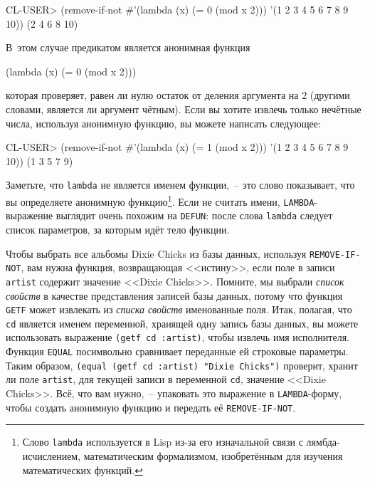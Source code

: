 \begin{myverb}
CL-USER> (remove-if-not #'(lambda (x) (= 0 (mod x 2))) '(1 2 3 4 5 6 7 8 9 10))
(2 4 6 8 10)
\end{myverb}

В~этом случае предикатом является анонимная функция

\begin{myverb}
(lambda (x) (= 0 (mod x 2)))
\end{myverb}

\noindent{}которая проверяет, равен ли нулю остаток от деления аргумента на 2 (другими словами,
является ли аргумент чётным). Если вы хотите извлечь только нечётные числа, используя
анонимную функцию, вы можете написать следующее:

\begin{myverb}
CL-USER> (remove-if-not #'(lambda (x) (= 1 (mod x 2))) '(1 2 3 4 5 6 7 8 9 10))
(1 3 5 7 9)
\end{myverb}

Заметьте, что \lstinline{lambda} не является именем функции,~-- это слово показывает, что вы
определяете анонимную функцию\footnote{Слово \lstinline{lambda} используется в Lisp из-за его
  изначальной связи с лямбда-исчислением, математическим формализмом, изобретённым для
  изучения математических функций.}. Если не считать имени, \lstinline{LAMBDA}-выражение
выглядит очень похожим на \lstinline{DEFUN}: после слова \lstinline{lambda} следует список
параметров, за которым идёт тело функции.

Чтобы выбрать все альбомы Dixie Chicks из базы данных, используя
\lstinline{REMOVE-IF-NOT}, вам нужна функция, возвращающая <<истину>>, если поле в записи
\lstinline{artist} содержит значение <<Dixie Chicks>>. Помните, мы выбрали \textit{список
  свойств} в качестве представления записей базы данных, потому что функция
\lstinline{GETF} может извлекать из \textit{списка свойств} именованные поля. Итак,
полагая, что \lstinline{cd} является именем переменной, хранящей одну запись базы данных,
вы можете использовать выражение \lstinline{(getf cd :artist)}, чтобы извлечь имя
исполнителя. Функция \lstinline{EQUAL} посимвольно сравнивает переданные ей строковые
параметры. Таким образом, \lstinline{(equal (getf cd :artist) "Dixie Chicks")} проверит,
хранит ли поле \lstinline{artist}, для текущей записи в переменной \lstinline{cd},
значение <<Dixie Chicks>>. Всё, что вам нужно,~-- упаковать это выражение в
\lstinline{LAMBDA}-форму, чтобы создать анонимную функцию и передать её
\lstinline{REMOVE-IF-NOT}.

